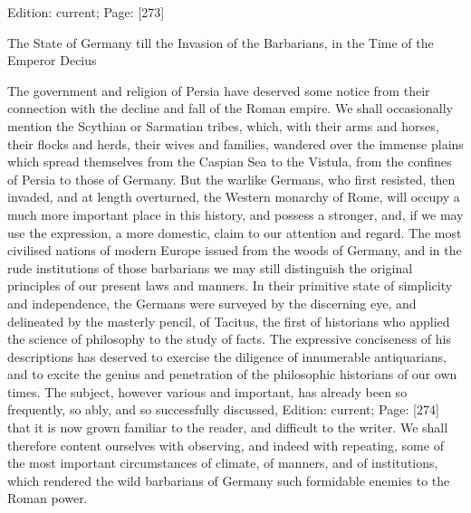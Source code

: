 Edition: current; Page: [273]


The State of Germany till the Invasion of the Barbarians, in the Time of the Emperor Decius

The government and religion of Persia have deserved some notice from their connection with the decline and fall of the Roman empire. We shall occasionally mention the Scythian or Sarmatian tribes, which, with their arms and horses, their flocks and herds, their wives and families, wandered over the immense plains which spread themselves from the Caspian Sea to the Vistula, from the confines of Persia to those of Germany. But the warlike Germans, who first resisted, then invaded, and at length overturned, the Western monarchy of Rome, will occupy a much more important place in this history, and possess a stronger, and, if we may use the expression, a more domestic, claim to our attention and regard. The most civilised nations of modern Europe issued from the woods of Germany, and in the rude institutions of those barbarians we may still distinguish the original principles of our present laws and manners. In their primitive state of simplicity and independence, the Germans were surveyed by the discerning eye, and delineated by the masterly pencil, of Tacitus, the first of historians who applied the science of philosophy to the study of facts. The expressive conciseness of his descriptions has deserved to exercise the diligence of innumerable antiquarians, and to excite the genius and penetration of the philosophic historians of our own times. The subject, however various and important, has already been so frequently, so ably, and so successfully discussed, Edition: current; Page: [274] that it is now grown familiar to the reader, and difficult to the writer. We shall therefore content ourselves with observing, and indeed with repeating, some of the most important circumstances of climate, of manners, and of institutions, which rendered the wild barbarians of Germany such formidable enemies to the Roman power.

